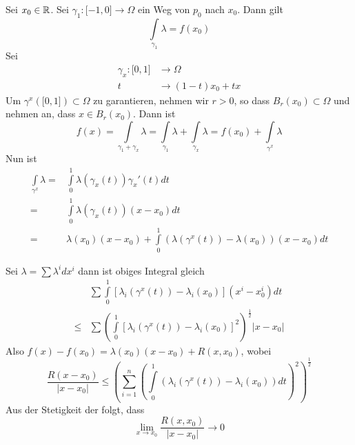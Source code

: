 \noindent Sei $x_0\in\mathbb{R}$. Sei $\gamma_1:\lbrack -1,0\rbrack\to\Omega$ ein Weg von $p_0$ nach $x_0$. Dann gilt \[\int\limits_{{\gamma _1}} \lambda   = f\left( {{x_0}} \right)\]
Sei
\begin{align*}
\gamma_x:\lbrack 0,1\rbrack &\to\Omega\\
t &\to (1-t)x_0+tx
\end{align*}
Um $\gamma^x\left( \lbrack 0,1\rbrack\right)\subset\Omega$ zu garantieren, nehmen wir $r>0$, so dass $B_r\left( x_0\right)\subset\Omega$ und nehmen an, dass $x\in B_r\left( x_0\right)$. Dann ist
\[f(x) = \int\limits_{{\gamma _1} + {\gamma _x}} \lambda   = \int\limits_{{\gamma _1}} \lambda   + \int\limits_{{\gamma _x}} \lambda   = f\left( {{x_0}} \right) + \int\limits_{{\gamma ^x}} \lambda  \]
Nun ist
\begin{align*}
\int\limits_{{\gamma ^x}} \lambda   = &\int\limits_0^1 {\lambda \left( {{\gamma _x}\left( t \right)} \right){\gamma _x}'\left( t \right)} dt\\
 = &\int\limits_0^1 {\lambda \left( {{\gamma _x}\left( t \right)} \right)\left( {x - {x_0}} \right)} dt\\
 = &\lambda \left( {{x_0}} \right)\left( {x - {x_0}} \right) + \int\limits_0^1 {\left( {\lambda \left( {{\gamma ^x}\left( t \right)} \right) - \lambda \left( {{x_0}} \right)} \right)\left( {x - {x_0}} \right)dt}
\end{align*}

Sei $\lambda  = \sum {{\lambda ^i}d{x^i}} $ dann ist obiges Integral gleich
\begin{align*}
&\sum {\int\limits_0^1 {\left[ {{\lambda _i}\left( {{\gamma ^x}\left( t \right)} \right) - {\lambda _i}\left( {{x_0}} \right)} \right]\left( {{x^i} - x_0^i} \right)dt} }\\
 \le &\sum {{{\left( {\int\limits_0^1 {{{\left[ {{\lambda _i}\left( {{\gamma ^x}\left( t \right)} \right) - {\lambda _i}\left( {{x_0}} \right)} \right]}^2}} } \right)}^{\frac{1}{2}}}} \left| {x - {x_0}} \right|
\end{align*}
Also $f\left( x \right) - f\left( {{x_0}} \right) = \lambda \left( {{x_0}} \right)\left( {x - {x_0}} \right) + R\left( {x,{x_0}} \right)$, wobei
\[\frac{{R\left( {x - {x_0}} \right)}}{{\left| {x - {x_0}} \right|}} \le {\left( {\sum\limits_{i = 1}^n {{{\left( {\int\limits_0^1 {\left( {{\lambda _i}\left( {{\gamma ^x}\left( t \right)} \right) - {\lambda _i}\left( {{x_0}} \right)} \right)dt} } \right)}^2}} } \right)^{\frac{1}{2}}}\]
Aus der Stetigkeit der  folgt, dass
\[\mathop {\lim }\limits_{x \to {x_0}} \frac{{R\left( {x,{x_0}} \right)}}{{\left| {x - {x_0}} \right|}} \to 0\]


